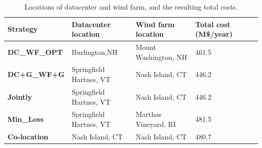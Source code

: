 \begin{table}[ht]
\begin{center}
\caption{Locations of datacenter and wind farm, and the resulting
  total costs.}
\begin{tabular}{|l|p{50pt}|p{50pt}|p{30pt}|p{20pt}|}
\hline
\textbf{Strategy}& \textbf{Datacenter location} &\textbf{Wind farm location} &\textbf{Total cost (M\$/year)}%
 \\
\hline
\textbf{DC\_WF\_OPT} &  Burlington,NH  & Mount Washington, NH & 461.5%
\\
\textbf{DC+G\_WF+G} &Springfield Hartnes, VT  & Nash Island, CT& 446.2%
\\
\textbf{Jointly} &Springfield Hartnes, VT&  Nash Island, CT & 446.2%
\\
\textbf{Min\_Loss} &Springfield Hartnes, VT & Marthas Vineyard, RI & 481.5%
\\
\textbf{Co-location}& Nash Island, CT &Nash Island, CT& 480.7%
\\
\hline
\end{tabular}
\label{tab:costsaving}
\end{center}
\vspace{-0.2in}
\end{table}

